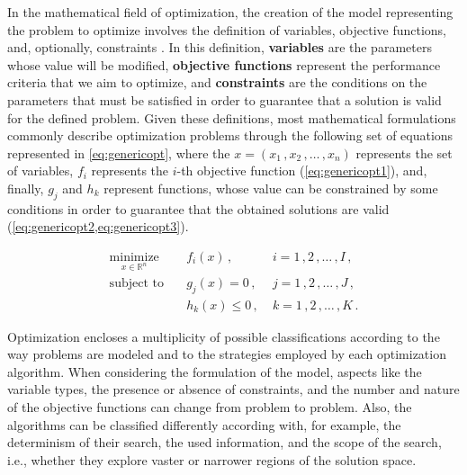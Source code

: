 	
In the mathematical field of optimization, the creation of the model representing the problem to optimize involves the definition of variables, objective functions, and, optionally, constraints \cite{Nocedal2011NumericalOptimization}. In this definition, \textbf{variables} are the parameters whose value will be modified, \textbf{objective functions} represent the performance criteria that we aim to optimize, and \textbf{constraints} are the conditions on the parameters that must be satisfied in order to guarantee that a solution is valid for the defined problem. Given these definitions, most mathematical formulations commonly describe optimization problems through the following set of equations represented in \cref{eq:genericopt}\cite{Koziel2011}, where the $x = (x_1\,, x_2\,, \ldots\,, x_n)$ represents the set of variables, $f_i$ represents the $i$-th objective function (\cref{eq:genericopt1}), and, finally, $g_j$ and $h_k$ represent functions, whose value can be constrained by some conditions in order to guarantee that the obtained solutions are valid (\cref{eq:genericopt2,eq:genericopt3}). 
	
	\begin{subequations}
		\label{eq:genericopt}
		\begin{align}
		\underset{x \in \mathbb{R}^n}{\text{minimize}}
		& \quad f_i(x)\,, &\; i = 1\,, 2\,, \ldots\,, I\,, 
		\label{eq:genericopt1}\\
		\text{subject to}
		& \quad g_j(x) = 0\,, &\; j = 1\,, 2\,, \ldots\,, J\,, \label{eq:genericopt2}\\ 
		& \quad h_k(x) \leq 0\,, &\; k = 1\,, 2\,, \ldots\,, K\,.  \label{eq:genericopt3}
		\end{align}
	\end{subequations}
	
	Optimization encloses a multiplicity of possible classifications according to the way problems are modeled and to the strategies employed by each optimization algorithm. When considering the formulation of the model, aspects like the variable types, the presence or absence of constraints, and the number and nature of the objective functions can change from problem to problem. Also, the algorithms can be classified differently according with, for example, the determinism of their search, the used information, and the scope of the search, i.e., whether they explore vaster or narrower regions of the solution space. 
	
